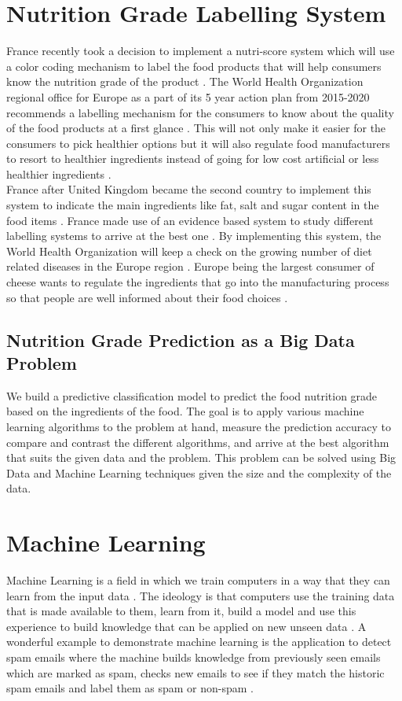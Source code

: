 \documentclass[sigconf]{acmart}
\begin{document}
\section{Nutrition Grade Labelling System}
France recently took a decision to implement a nutri-score system which will use a color coding mechanism to label the food products that will help consumers know the nutrition grade of the product \cite{www-who}. The World Health Organization regional office for Europe as a part of its 5 year action plan from 2015-2020 recommends a labelling mechanism for the consumers to know about the quality of the food products at a first glance \cite{www-who}. This will not only make it easier for the consumers to pick healthier options but it will also regulate food manufacturers to resort to healthier ingredients instead of going for low cost artificial or less healthier ingredients \cite{www-who}.  \\

France after United Kingdom became the second country to implement this system to indicate the main ingredients like fat, salt and sugar content in the food items \cite{www-who}. France made use of an evidence based system to study different labelling systems to arrive at the best one \cite{www-who}. By implementing this system, the World Health Organization will keep a check on the growing number of diet related diseases in the Europe region \cite{www-who}. Europe being the largest consumer of cheese wants to regulate the ingredients that go into the manufacturing process so that people are well informed about their food choices \cite{www-who}.

\subsection{Nutrition Grade Prediction as a Big Data Problem}
We build a predictive classification model to predict the food nutrition grade based on the ingredients of the food. The goal is to apply various machine learning algorithms to the problem at hand, measure the prediction accuracy to compare and contrast the different algorithms, and arrive at the best algorithm that suits the given data and the problem. This problem can be solved using Big Data and Machine Learning techniques given the size and the complexity of the data.

\section{Machine Learning}
Machine Learning is a field in which we train computers in a way that they can learn from the input data \cite{book-shai}. The ideology is that computers use the training data that is made available to them, learn from it, build a model and use this experience to build knowledge that can be applied on new unseen data \cite{book-shai}. A wonderful example to demonstrate machine learning is the application to detect spam emails where the machine builds knowledge from previously seen emails which are marked as spam, checks new emails to see if they match the historic spam emails and label them as spam or non-spam \cite{book-shai}. 
\end{document}
